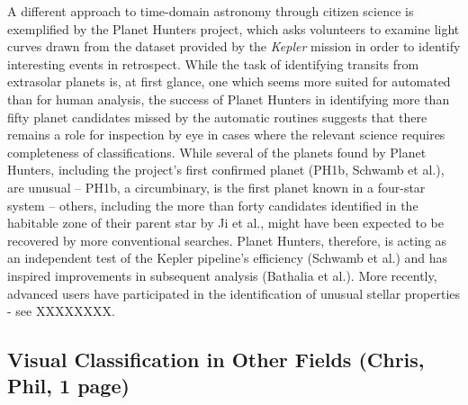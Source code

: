 \documentclass{ar2e}
\begin{document}
A different approach to time-domain astronomy through citizen science is
exemplified by the Planet Hunters project, which asks volunteers to examine
light curves drawn from the dataset provided by the \emph{Kepler} mission in
order to identify interesting events in retrospect. While the task of
identifying transits from extrasolar planets is, at first glance, one which
seems more suited for automated than for human analysis, the success of Planet
Hunters in identifying more than fifty planet candidates missed by the
automatic routines suggests that there remains a role for inspection by eye in
cases where the relevant science requires completeness of classifications.
While several of the planets found by Planet Hunters, including the project's
first confirmed planet (PH1b, Schwamb et al.), are unusual 
-- PH1b, a
circumbinary, is the first planet known in a four-star system --  others,
including the more than forty candidates identified in the habitable zone of
their parent star by Ji et al., might have been expected to be recovered by
more conventional searches. Planet Hunters, therefore, is acting as an
independent test of the Kepler pipeline's efficiency (Schwamb et al.) and has
inspired improvements in subsequent analysis (Bathalia et al.). More recently,
advanced users have participated in the identification of unusual stellar
properties - see XXXXXXXX. 





\subsection{Visual Classification in Other Fields (\textbf{Chris}, Phil, 1 page)}
\label{sec:class:non-astro}
\end{document}
